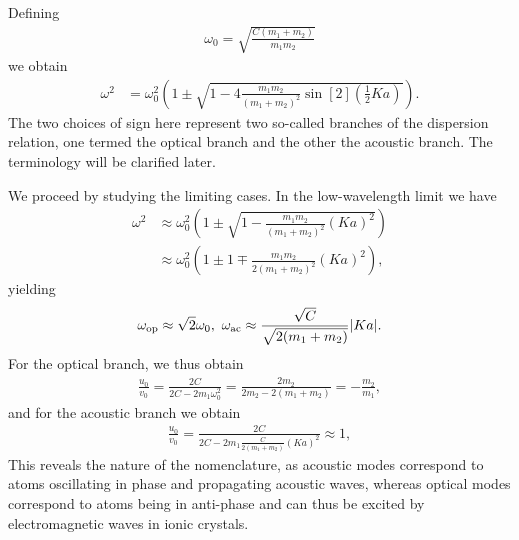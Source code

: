 Defining
\begin{align*}
	\omega_{0} = \sqrt{\frac{C(m_{1} + m_{2})}{m_{1}m_{2}}}
\end{align*}
we obtain
\begin{align*}
	\omega^{2} &= \omega_{0}^{2}\left(1 \pm \sqrt{1 - 4\frac{m_{1}m_{2}}{(m_{1} + m_{2})^{2}}\sin[2](\frac{1}{2}Ka)}\right).
\end{align*}
The two choices of sign here represent two so-called branches of the dispersion relation, one termed the optical branch and the other the acoustic branch. The terminology will be clarified later.

We proceed by studying the limiting cases. In the low-wavelength limit we have
\begin{align*}
	\omega^{2} &\approx \omega_{0}^{2}\left(1 \pm \sqrt{1 - \frac{m_{1}m_{2}}{(m_{1} + m_{2})^{2}}(Ka)^{2}}\right) \\
	           &\approx \omega_{0}^{2}\left(1 \pm 1 \mp \frac{m_{1}m_{2}}{2(m_{1} + m_{2})^{2}}(Ka)^{2}\right),
\end{align*}
yielding
\begin{align*}
	\omega_{\text{op}} \approx \sqrt{2}\omega_{0},\ \omega_{\text{ac}} \approx \frac{\sqrt{C}}{\sqrt{2(m_{1} + m_{2})}}\abs{Ka}.
\end{align*}
For the optical branch, we thus obtain
\begin{align*}
	\frac{u_{0}}{v_{0}} = \frac{2C}{2C - 2m_{1}\omega_{0}^{2}} = \frac{2m_{2}}{2m_{2} - 2(m_{1} + m_{2})} = -\frac{m_{2}}{m_{1}},
\end{align*}
and for the acoustic branch we obtain
\begin{align*}
	\frac{u_{0}}{v_{0}} = \frac{2C}{2C - 2m_{1}\frac{C}{2(m_{1} + m_{2})}(Ka)^{2}} \approx 1,
\end{align*}
This reveals the nature of the nomenclature, as acoustic modes correspond to atoms oscillating in phase and propagating acoustic waves, whereas optical modes correspond to atoms being in anti-phase and can thus be excited by electromagnetic waves in ionic crystals.

